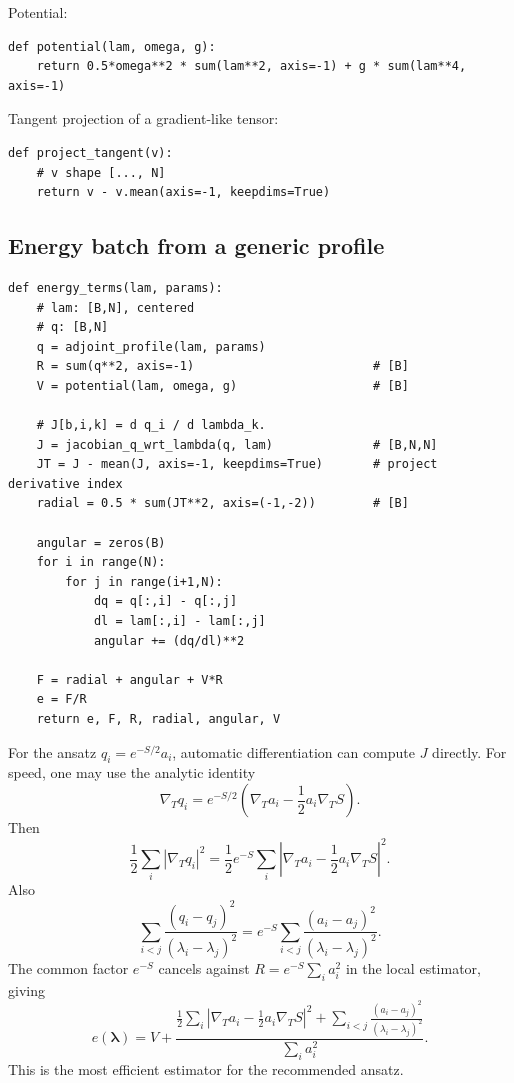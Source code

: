 \documentclass[11pt]{article}
\newcommand{\gradT}{\nabla_{\!T}}
\begin{document}
Potential:
\begin{lstlisting}
def potential(lam, omega, g):
    return 0.5*omega**2 * sum(lam**2, axis=-1) + g * sum(lam**4, axis=-1)
\end{lstlisting}

Tangent projection of a gradient-like tensor:
\begin{lstlisting}
def project_tangent(v):
    # v shape [..., N]
    return v - v.mean(axis=-1, keepdims=True)
\end{lstlisting}

\subsection{Energy batch from a generic profile}

\begin{lstlisting}
def energy_terms(lam, params):
    # lam: [B,N], centered
    # q: [B,N]
    q = adjoint_profile(lam, params)
    R = sum(q**2, axis=-1)                         # [B]
    V = potential(lam, omega, g)                   # [B]

    # J[b,i,k] = d q_i / d lambda_k.
    J = jacobian_q_wrt_lambda(q, lam)              # [B,N,N]
    JT = J - mean(J, axis=-1, keepdims=True)       # project derivative index
    radial = 0.5 * sum(JT**2, axis=(-1,-2))        # [B]

    angular = zeros(B)
    for i in range(N):
        for j in range(i+1,N):
            dq = q[:,i] - q[:,j]
            dl = lam[:,i] - lam[:,j]
            angular += (dq/dl)**2

    F = radial + angular + V*R
    e = F/R
    return e, F, R, radial, angular, V
\end{lstlisting}

For the ansatz $q_i=e^{-S/2}a_i$, automatic differentiation can compute $J$ directly.  For speed, one may use the analytic identity
\begin{equation}
\gradT q_i=e^{-S/2}\left(\gradT a_i-\frac12a_i\gradT S\right).
\end{equation}
Then
\begin{equation}
\frac12\sum_i|\gradT q_i|^2
=\frac12e^{-S}\sum_i\left|\gradT a_i-\frac12a_i\gradT S\right|^2.
\end{equation}
Also
\begin{equation}
\sum_{i<j}\frac{(q_i-q_j)^2}{(\lambda_i-\lambda_j)^2}
=e^{-S}\sum_{i<j}\frac{(a_i-a_j)^2}{(\lambda_i-\lambda_j)^2}.
\end{equation}
The common factor $e^{-S}$ cancels against $R=e^{-S}\sum_i a_i^2$ in the local estimator, giving
\begin{equation}
\boxed{
 e(\bm\lambda)=V+
\frac{
\frac12\sum_i\left|\gradT a_i-\frac12a_i\gradT S\right|^2
+\sum_{i<j}\frac{(a_i-a_j)^2}{(\lambda_i-\lambda_j)^2}
}{
\sum_i a_i^2
}.
}
\label{eq:local_estimator_aS}
\end{equation}
This is the most efficient estimator for the recommended ansatz.
\end{document}
